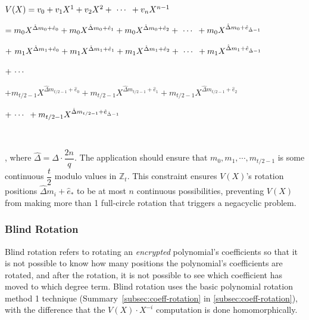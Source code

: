 \begin{tcolorbox}[title={\textbf{\tboxlabel{\ref*{subsec:tfhe-zero-padding}} Structure of Lookup Table Polynomial $\bm{V(X)}$}}]

$ $

$V(X) = v_0 + v_1X^1 + v_2X^2 + \text{ } \text{$\cdots$} \text{ } + v_nX^{n-1}$

\text{ } $= m_0X^{\hat{\Delta} m_0 + \hat{e}_0} + m_0X^{\hat{\Delta} m_0 + \hat{e}_1} + m_0X^{\hat{\Delta} m_0 + \hat{e}_2} + \text{ } \text{$\cdots$} \text{ } + m_0X^{\hat{\Delta} m_0 + \hat{e}_{\hat{\Delta} - 1}}$

\text{ } $ + \text{ } m_1X^{\hat{\Delta} m_1 + \hat{e}_0} + m_1X^{\hat{\Delta} m_1 + \hat{e}_1} + m_1X^{\hat{\Delta} m_1 + \hat{e}_2} + \text{ } \text{$\cdots$} \text{ } + m_1X^{\hat{\Delta} m_1 + \hat{e}_{\hat{\Delta} - 1}}$

\text{ } $ + \text{ } \text{$\cdots$} \text{ } $

\text{ } $ + m_{{t}/{2} - 1}X^{\hat{\Delta} m_{{t}/{2} - 1} + \hat{e}_0} + m_{{t}/{2} - 1}X^{\hat{\Delta} m_{{t}/{2} - 1} + \hat{e}_1} + m_{{t}/{2} - 1}X^{\hat{\Delta} m_{{t}/{2} - 1} + \hat{e}_2}$

\text{ } \text{ } $ + \text{ } \text{$\cdots$} \text{ } + m_{{t}/{2} - 1}X^{\hat{\Delta} m_{{t}/{2} - 1} + \hat{e}_{\hat{\Delta} - 1}}$

$ $

\noindent , where $\hat\Delta = \Delta \cdot \dfrac{2n}{q}$. The application should ensure that $m_0, m_1, \cdots, m_{t/2 - 1}$ is some continuous $\dfrac{t}{2}$ modulo values in $\mathbb{Z}_t$. This constraint ensures $V(X)$'s rotation positions $\hat{\Delta} m_i + \hat e_{*}$ to be at most $n$ continuous possibilities, preventing $V(X)$ from making more than 1 full-circle rotation that triggers a negacyclic problem. 


\end{tcolorbox}


\subsubsection{Blind Rotation}
\label{subsec:bootstrapping-blind-rotation} 

Blind rotation refers to rotating an \textit{encrypted} polynomial's coefficients so that it is not possible to know how many positions the polynomial's coefficients are rotated, and after the rotation, it is not possible to see which coefficient has moved to which degree term. Blind rotation uses the basic polynomial rotation method 1 technique (Summary~\ref*{subsec:coeff-rotation} in \autoref{subsec:coeff-rotation}), with the difference that the $V(X)\cdot X^{-i}$ computation is done homomorphically. 


